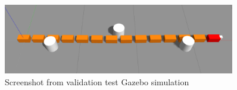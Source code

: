 \begin{figure}[h!]
    \centering
    \includegraphics[width=0.9\textwidth]{figures/experiments/exp_valid1_gazebo.png}
    \caption{Screenshot from validation test Gazebo simulation}
    \label{fig:valid1_gazebo}
\end{figure}